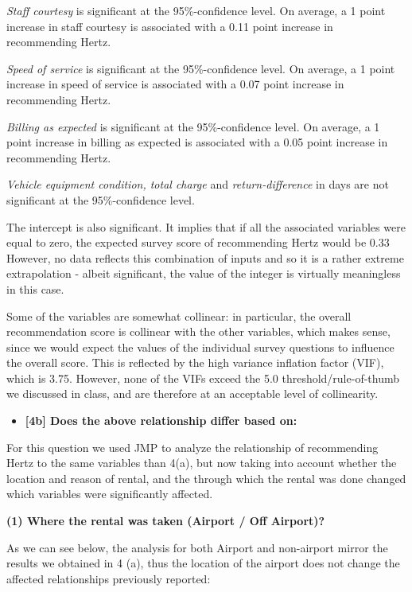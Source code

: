 \documentclass[10pt, oneside,spanish]{article}
\begin{document}
\textit{Staff courtesy} is significant at the 95\%-confidence level. On average, a 1 point increase in staff courtesy is associated with a 0.11 point increase in recommending Hertz.

\textit{Speed of service} is significant at the 95\%-confidence level. On average, a 1 point increase in speed of service is associated with a 0.07 point increase in recommending Hertz.

\textit{Billing as expected} is significant at the 95\%-confidence level. On average, a 1 point increase in billing as expected is associated with a 0.05 point increase in recommending Hertz.

\textit{Vehicle equipment condition, total charge} and \textit{return-difference} in days are not significant at the 95\%-confidence level. 

The intercept is also significant. It implies that if all the associated variables were equal to zero, the expected survey score of recommending Hertz would be 0.33 However, no data reflects this combination of inputs and so it is a rather extreme extrapolation - albeit significant, the value of the integer is virtually meaningless in this case. 

Some of the variables are somewhat collinear: in particular, the overall recommendation score is collinear with the other variables, which makes sense, since we would expect the values of the individual survey questions to influence the overall score. This is reflected by the high variance inflation factor (VIF), which is 3.75. However, none of the VIFs exceed the 5.0 threshold/rule-of-thumb we discussed in class, and are therefore at an acceptable level of collinearity.



\begin{itemize}
\item \textbf{ [4b] Does the above relationship differ based on: }
\end{itemize}

For this question we used JMP to analyze the relationship of recommending Hertz to the same variables than 4(a), but now taking into account whether the location and reason of rental, and the through which the rental was done changed which variables were significantly affected.




\textbf{(1) Where the rental was taken (Airport / Off Airport)?}

As we can see below, the analysis for both Airport and non-airport mirror the results we obtained in 4 (a), thus the location of the airport does not change the affected relationships previously reported:
\end{document}
